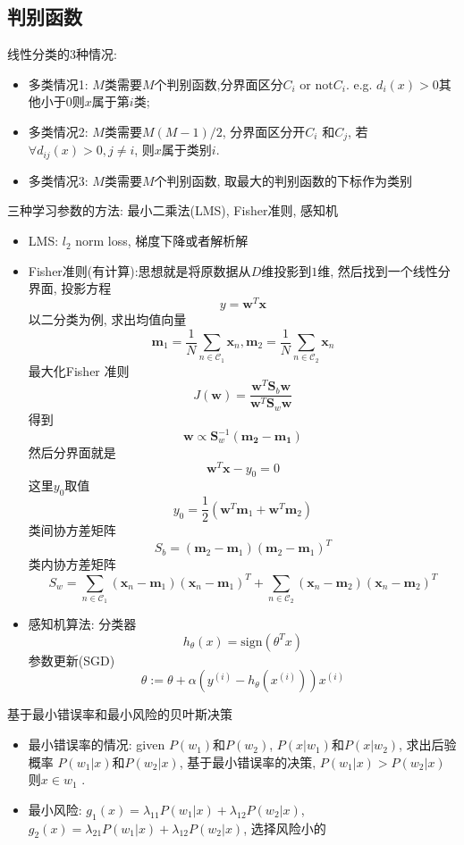 \documentclass[12pt,letterpaper]{article}
\begin{document}
\subsection{判别函数}
线性分类的3种情况:
	\begin{itemize}
		\item 多类情况1: $M$类需要$M$个判别函数,分界面区分$C_i$ or $\text{not} C_i$. e.g.  $d_i(x) > 0$其他小于0则$x$属于第$i$类;  
		\item 多类情况2: $M$类需要$M(M-1)/2$, 分界面区分开$C_i$ 和$C_j$, 若$\forall d_{ij}(x) > 0, j\neq i$, 则$x$属于类别$i$. 
		\item 多类情况3: $M$类需要$M$个判别函数, 取最大的判别函数的下标作为类别
	\end{itemize}
三种学习参数的方法: 最小二乘法(LMS), Fisher准则, 感知机 
\begin{itemize}
	\item LMS: $l_2$ norm loss, 梯度下降或者解析解
	\item Fisher准则(有计算):思想就是将原数据从$D$维投影到$1$维, 然后找到一个线性分界面, 投影方程
	\[
		y = \bm{w}^T \bm{x} 
	\] 
	以二分类为例, 求出均值向量
	\[
		\bm{m}_1 = \frac{1}{N}\sum_{n\in \mathcal{C}_1} \bm{x}_n,
		\bm{m}_2 = \frac{1}{N}\sum_{n\in \mathcal{C}_2} \bm{x}_n
	\]
	最大化Fisher 准则
	\[
	 	J(\bm{w}) = \frac{\bm{w}^T\bm{S}_b\bm{w}}{\bm{w}^T\bm{S}_w\bm{w}}
	\]
	得到
	\[
		\bm{w} \propto \bm{S}_w^{-1} (\bm{m_2} - \bm{m_1})
	\]
	然后分界面就是
	\[
		\bm{w}^T\bm{x} - y_0 = 0
	\]
	这里$y_0$取值
	\[
		y_0 = \frac{1}{2}(\bm{w}^T\bm{m}_1 + \bm{w}^T\bm{m}_2	)
	\]
	类间协方差矩阵 
	\[
		S_b= (\bm{m}_2 - \bm{m}_1)(\bm{m}_2 - \bm{m}_1)^T
	\]
	类内协方差矩阵
	\[
		S_w = \sum_{n\in \mathcal{C}_1} (\bm{x}_n - \bm{m}_1)(\bm{x}_n - \bm{m}_1)^T
		+  \sum_{n\in \mathcal{C}_2} (\bm{x}_n - \bm{m}_2)(\bm{x}_n - \bm{m}_2)^T
	\]
	\item 感知机算法:
		分类器
		\[
			h_{\theta}(x) = \text{sign}(\theta^Tx)
		\]
	    参数更新(SGD)
	    \[
		    \theta := \theta + \alpha(y^{(i)} - h_{\theta}(x^{(i)}))x^{(i)}
	    \]


\end{itemize}
基于最小错误率和最小风险的贝叶斯决策
\begin{itemize}
	\item 最小错误率的情况: given   $P(w_1)$和$P(w_2)$, $P(x|w_1)$和$P(x|w_2)$, 求出后验概率 $P(w_1|x)$和$P(w_2|x)$,  基于最小错误率的决策, $P(w_1|x) > P(w_2|x)$ 则$x\in w_1$ .
	\item 最小风险: $g_1(x) = \lambda_{11} P(w_1|x) + \lambda_{12} P(w_2|x)$, $g_2(x) = \lambda_{21} P(w_1|x) + \lambda_{12} P(w_2|x)$,  选择风险小的
\end{itemize}
\end{document}
